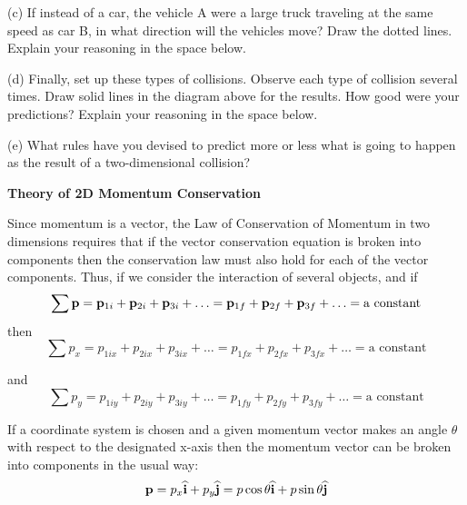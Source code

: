 (c) If instead of a car, the vehicle A were a large truck traveling at the same
speed as car B, in what direction will the vehicles move? Draw the dotted lines.
Explain your reasoning in the space below.
\vspace{20mm}


(d) Finally, set up these types of collisions. Observe each type of collision
several times. Draw solid lines in the diagram above for the results. How good
were your predictions? Explain your reasoning in the space below.
\vspace{20mm}

(e) What rules have you devised to predict more or less what is going to happen
as the result of a two-dimensional collision?
\vspace{20mm}

\textbf{Theory of 2D Momentum Conservation }

Since momentum is a vector, the Law of Conservation of Momentum in two dimensions
requires that if the vector conservation equation is broken into components
then the conservation law must also hold for each of the vector components.
Thus, if we consider the interaction of several objects, and if 
\[
\sum {\bf p}={{\bf p}_{1i}}+{{\bf p}_{2i}}+{{\bf p}_{3i}}+\ldots ={{\bf p}_{1f}}+{{\bf p}_{2f}}+{{\bf p}_{3f}}+\ldots =\mbox{a constant}\]
then
\[
\sum p_{x}=p_{1ix}+p_{2ix}+p_{3ix}+\ldots =p_{1fx}+p_{2fx}+p_{3fx}+\ldots =
\mbox{a constant}\]


and
\[
\sum p_{y}=p_{1iy}+p_{2iy}+p_{3iy}+\ldots =p_{1fy}+p_{2fy}+p_{3fy}+\ldots =
\mbox{a constant}\]


If a coordinate system is chosen and a given momentum vector makes an angle
\( \theta  \) with respect to the designated x-axis then the momentum vector
can be broken into components in the usual way:
\[
{\bf p}=p_{x}\widehat{\bf i}+p_{y}\widehat{\bf j}=p\cos \theta \widehat{\bf i}+
p\sin \theta \widehat{\bf j}\]



